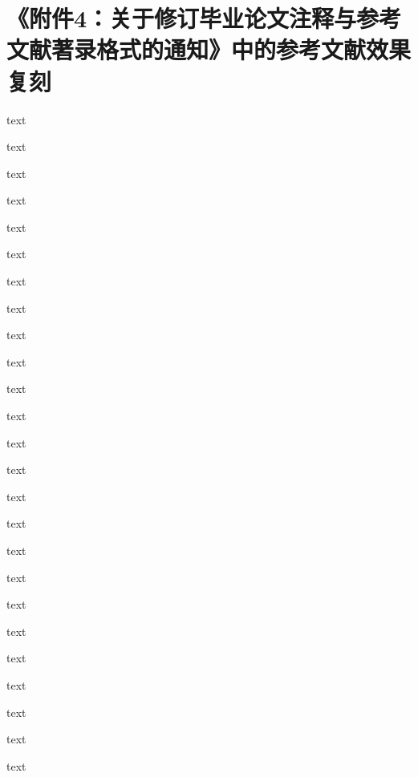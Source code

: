 \section{《附件4：关于修订毕业论文注释与参考文献著录格式的通知》中的参考文献效果复刻}

  text\parencite{李晓东rawtype}

  text\parencite{Ahnrawtype}

  text\parencite{Ahnrawtype}

  text\parencite{丁文祥rawtype}

  text\parencite{邱泽奇会议论文集rawtype}

  text\parencite{雷光春rawtype}

  text\parencite{zhangrawtype}

  text\parencite{邱泽奇会议论文rawtype}

  text\parencite{马克思rawtype}

  text\parencite{昂温rawtype}

  text\parencite{Fothrawtype}

  text\parencite{杨国枢rawtype}

  text\parencite{Morisonrawtype}

  text\parencite{张志祥rawtype}

  text\parencite{徐秀英rawtype}

  text\parencite{Aldemitarawtype}

  text\parencite{张凯军rawtype}

  text\parencite{Kosekrawtype}

  text\parencite{文献编写rawtype}

  text\parencite{国防白皮rawtype}

  text\parencite{federalrawtype}

  text\parencite{healthrawtype}

  text\parencite{江向东rawtype}

  text\parencite{萧钮rawtype}

  text\parencite{Dublinrawtype}